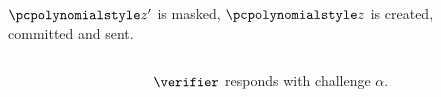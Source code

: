 \documentclass[aspectratio=169]{beamer}
\begin{document}
\begin{frame}
\begin{columns}
\begin{column}{0.5\linewidth}
      $\p{z'}$ is masked, $\p{z}$ is created, committed and sent.
    \end{column}\pause
    \begin{column}{0.5\linewidth}
    \end{column}
  \end{columns}
      \begin{columns}
      \begin{column}{0.5\linewidth}
    \end{column}
    \begin{column}{0.5\linewidth}
      $\verifier$ responds with challenge $\alpha$.
    \end{column}
  \end{columns}

\end{frame}
\end{document}
